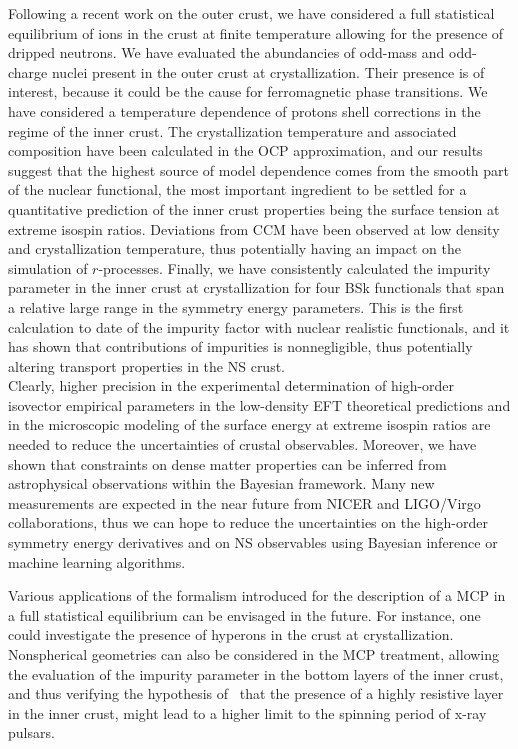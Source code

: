 Following a recent work on the outer crust, we have considered a full
statistical equilibrium of ions in the crust at finite temperature allowing for 
the presence of dripped neutrons. We have evaluated the abundancies of odd-mass 
and odd-charge nuclei present in the outer crust at crystallization. Their
presence is of interest, because it could be the cause for ferromagnetic phase 
transitions. 
We have considered a temperature dependence of protons shell corrections in the 
regime of the inner crust. The crystallization temperature and associated
composition have been calculated in the OCP approximation, and our results
suggest that the highest source of model dependence comes from the smooth part
of the nuclear functional, the most important ingredient to be settled for a
quantitative prediction of the inner crust properties being the surface tension
at extreme isospin ratios. 
Deviations from CCM have been observed at low density and crystallization
temperature, thus potentially having an impact on the simulation of 
$r$-processes.
Finally, we have consistently calculated the impurity parameter in the inner 
crust at crystallization for four BSk functionals that span a relative large 
range in the symmetry energy parameters. This is the first calculation to date
of the impurity factor with nuclear realistic functionals, and it has shown 
that contributions of impurities is nonnegligible, thus potentially altering 
transport properties in the NS crust.
\\

Clearly, higher precision in the experimental determination of high-order
isovector empirical parameters in the low-density EFT theoretical predictions 
and in the microscopic modeling of the surface energy at extreme isospin ratios 
are needed to reduce the uncertainties of crustal observables. Moreover, 
we have shown that constraints on dense matter properties can be inferred from 
astrophysical observations within the Bayesian framework. 
Many new measurements are expected in the near future from NICER and LIGO/Virgo 
collaborations, thus we can hope to reduce the uncertainties on the 
high-order symmetry energy derivatives and on NS observables using Bayesian 
inference or machine learning algorithms.

Various applications of the formalism introduced for the description of a MCP 
in a full statistical equilibrium can be envisaged in the future. For instance, 
one could investigate the presence of hyperons in the crust at crystallization. 
Nonspherical geometries can also be considered in the MCP treatment, allowing 
the evaluation of the impurity parameter in the bottom layers of the inner 
crust, and thus verifying the hypothesis of~\cite{Pons2013} that the presence
of a highly resistive layer in the inner crust, might lead to a higher limit to
the spinning period of x-ray pulsars.

